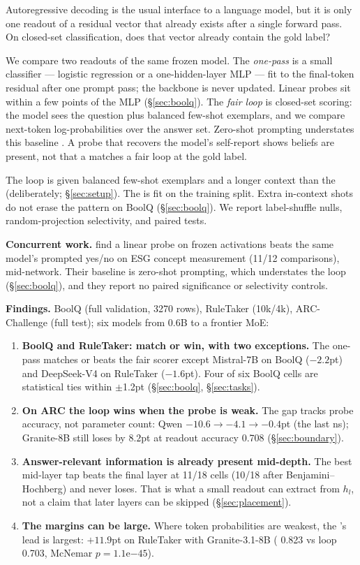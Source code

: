 Autoregressive decoding is the usual interface to a language model, but it is
only one readout of a residual vector that already exists after a single
forward pass. On closed-set classification, does that vector already contain
the gold label?

We compare two readouts of the same frozen model. The \emph{one-pass
\head{}} is a small classifier --- logistic regression or a one-hidden-layer
MLP --- fit to the final-token residual after one prompt pass; the backbone
is never updated. Linear probes sit within a few points of the MLP
(\S\ref{sec:boolq}). The \emph{fair loop} is closed-set scoring: the model
sees the question plus balanced few-shot exemplars, and we compare next-token
log-probabilities over the answer set. Zero-shot prompting understates this
baseline \citep{cho2025hidden}. A probe that recovers the model's self-report
shows beliefs are present, not that a \head{} matches a fair loop at the gold
label.

The loop is given balanced few-shot exemplars and a longer context than the
\head{} (deliberately; \S\ref{sec:setup}). The \head{} is fit on the training
split. Extra in-context shots do not erase the pattern on BoolQ
(\S\ref{sec:boolq}). We report label-shuffle nulls, random-projection
selectivity, and paired tests.

\textbf{Concurrent work.} \citet{hazenoot2026esg} find a linear probe on frozen
activations beats the same model's prompted yes/no on ESG concept measurement
(11/12 comparisons), mid-network. Their baseline is zero-shot prompting, which
understates the loop (\S\ref{sec:boolq}), and they report no paired
significance or selectivity controls.

\textbf{Findings.} BoolQ (full validation, 3270 rows), RuleTaker (10k/4k),
ARC-Challenge (full test); six models from 0.6B to a frontier MoE:

\begin{enumerate}
\item \textbf{BoolQ and RuleTaker: match or win, with two exceptions.} The
  one-pass \head{} matches or beats the fair scorer except Mistral-7B on BoolQ
  ($-2.2$pt) and DeepSeek-V4 on RuleTaker ($-1.6$pt). Four of six BoolQ cells
  are statistical ties within $\pm$1.2pt (\S\ref{sec:boolq}, \S\ref{sec:tasks}).
\item \textbf{On ARC the loop wins when the probe is weak.} The
  gap tracks probe accuracy, not parameter count: Qwen $-10.6 \to -4.1 \to
  -0.4$pt (the last ns); Granite-8B still loses by $8.2$pt at readout
  accuracy 0.708 (\S\ref{sec:boundary}).
\item \textbf{Answer-relevant information is already present mid-depth.} The
  best mid-layer tap beats the final layer at 11/18 cells (10/18 after
  Benjamini--Hochberg) and never loses. That is what a small readout can
  extract from $h_l$, not a claim that later layers can be skipped
  (\S\ref{sec:placement}).
\item \textbf{The margins can be large.} Where token probabilities are
  weakest, the \head{}'s lead is largest: $+11.9$pt on RuleTaker with
  Granite-3.1-8B (\head{} 0.823 vs loop 0.703, McNemar $p=1.1\mathrm{e}{-45}$).
\end{enumerate}

